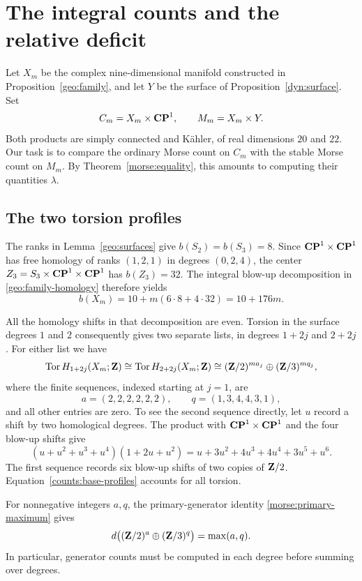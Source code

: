 \section{The integral counts and the relative deficit}
\label{sec:counts}

Let $X_m$ be the complex nine-dimensional manifold constructed in
Proposition~\ref{geo:family}, and let $Y$ be the surface of
Proposition~\ref{dyn:surface}. Set
\[
 C_m=X_m\times\mathbf{CP}^1,\qquad M_m=X_m\times Y.
\]
Both products are simply connected and Kähler, of real dimensions $20$
and $22$. Our task is to compare the ordinary Morse count on $C_m$ with
the stable Morse count on $M_m$. By Theorem~\ref{morse:equality}, this
amounts to computing their quantities $\lambda$.

\subsection{The two torsion profiles}
The ranks in Lemma~\ref{geo:surfaces} give $b(S_2)=b(S_3)=8$.
Since $\mathbf{CP}^1\times\mathbf{CP}^1$ has free homology of ranks $(1,2,1)$ in degrees
$(0,2,4)$, the center $Z_3=S_3\times\mathbf{CP}^1\times\mathbf{CP}^1$ has
$b(Z_3)=32$. The integral blow-up decomposition in
\eqref{geo:family-homology} therefore yields
\begin{equation}\label{counts:rank-X}
 b(X_m)=10+m(6\cdot8+4\cdot32)=10+176m.
\end{equation}

All the homology shifts in that decomposition are even. Torsion in the
surface degrees $1$ and $2$ consequently gives two separate lists, in
degrees $1+2j$ and $2+2j$. For either list we have
\begin{equation}\label{counts:base-profiles}
 \operatorname{Tor} H_{1+2j}(X_m;\mathbf Z)\cong\operatorname{Tor} H_{2+2j}(X_m;\mathbf Z)
 \cong(\mathbf Z/2)^{ma_j}\oplus(\mathbf Z/3)^{mq_j},
\end{equation}
where the finite sequences, indexed starting at $j=1$, are
\[
 a=(2,2,2,2,2,2),\qquad q=(1,3,4,4,3,1),
\]
and all other entries are zero. To see the second sequence directly, let
$u$ record a shift by two homological degrees. The product with
$\mathbf{CP}^1\times\mathbf{CP}^1$ and the four blow-up shifts give
\[
 (u+u^2+u^3+u^4)(1+2u+u^2)
 =u+3u^2+4u^3+4u^4+3u^5+u^6.
\]
The first sequence records six blow-up shifts of two copies of $\mathbf Z/2$.
Equation~\eqref{counts:base-profiles} accounts for all torsion.

For nonnegative integers $a,q$, the primary-generator identity
\eqref{morse:primary-maximum} gives
\begin{equation}\label{counts:generator-maximum}
 d\bigl((\mathbf Z/2)^a\oplus(\mathbf Z/3)^q\bigr)=\max(a,q).
\end{equation}
In particular, generator counts must be computed in each degree
before summing over degrees.


